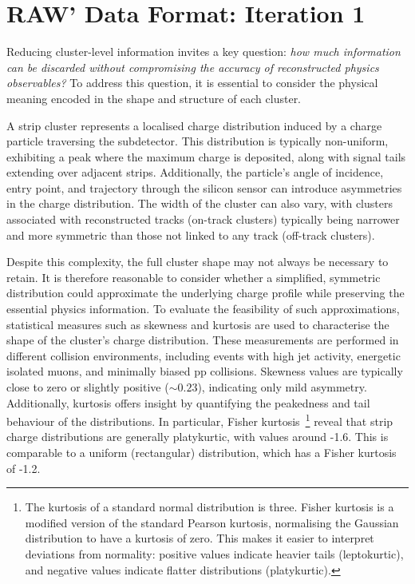 \section{RAW' Data Format: Iteration 1}
\label{Section:Chapter5-RAW'_Iteration_1}
Reducing cluster-level information invites a key question: \textit{how much information can be discarded without compromising the accuracy of reconstructed physics observables?} To address this question, it is essential to consider the physical meaning encoded in the shape and structure of each cluster. 

A strip cluster represents a localised charge distribution induced by a charge particle traversing the subdetector. This distribution is typically non-uniform, exhibiting a peak where the maximum charge is deposited, along with signal tails extending over adjacent strips. Additionally, the particle's angle of incidence, entry point, and trajectory through the silicon sensor can introduce asymmetries in the charge distribution. The width of the cluster can also vary, with clusters associated with reconstructed tracks (on-track clusters) typically being narrower and more symmetric than those not linked to any track (off-track clusters).

Despite this complexity, the full cluster shape may not always be necessary to retain. It is therefore reasonable to consider whether a simplified, symmetric distribution could approximate the underlying charge profile while preserving the essential physics information. To evaluate the feasibility of such approximations, statistical measures such as skewness and kurtosis are used to characterise the shape of the cluster's charge distribution. These measurements are performed in different collision environments, including events with high jet activity, energetic isolated muons, and minimally biased pp collisions. Skewness values are typically close to zero or slightly positive ($\sim 0.23$), indicating only mild asymmetry. Additionally, kurtosis offers insight by quantifying the peakedness and tail behaviour of the distributions. In particular, Fisher kurtosis~\cite{Kurtosis}\footnote{The kurtosis of a standard normal distribution is three. Fisher kurtosis is a modified version of the standard Pearson kurtosis, normalising the Gaussian distribution to have a kurtosis of zero. This makes it easier to interpret deviations from normality: positive values indicate heavier tails (leptokurtic), and negative values indicate flatter distributions (platykurtic).} reveal that strip charge distributions are generally platykurtic, with values around -1.6. This is comparable to a uniform (rectangular) distribution, which has a Fisher kurtosis of -1.2.

